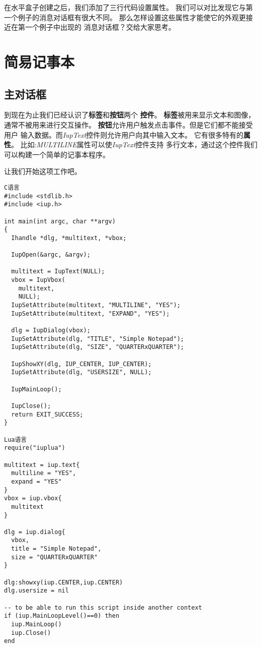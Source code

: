 \documentclass{ctexart}
\begin{document}
在水平盒子创建之后，我们添加了三行代码设置属性。
我们可以对比发现它与第一个例子的消息对话框有很大不同。
那么怎样设置这些属性才能使它的外观更接近在第一个例子中出现的
消息对话框？交给大家思考。

\section{简易记事本}

\subsection{主对话框}

到现在为止我们已经认识了\textbf{标签}和\textbf{按钮}两个
\textbf{控件}。
\textbf{标签}被用来显示文本和图像，通常不被用来进行交互操作。
\textbf{按钮}允许用户触发点击事件。但是它们都不能接受用户
输入数据。而\emph{IupText}控件则允许用户向其中输入文本。
它有很多特有的\textbf{属性}。
比如:\emph{MULTILINE}属性可以使\emph{IupText}控件支持
多行文本，通过这个控件我们可以构建一个简单的记事本程序。

让我们开始这项工作吧。

\lstset{language=C}
\begin{lstlisting}
C语言
#include <stdlib.h>
#include <iup.h>

int main(int argc, char **argv)
{
  Ihandle *dlg, *multitext, *vbox;

  IupOpen(&argc, &argv);

  multitext = IupText(NULL);
  vbox = IupVbox(
    multitext,
    NULL);
  IupSetAttribute(multitext, "MULTILINE", "YES");
  IupSetAttribute(multitext, "EXPAND", "YES");

  dlg = IupDialog(vbox);
  IupSetAttribute(dlg, "TITLE", "Simple Notepad");
  IupSetAttribute(dlg, "SIZE", "QUARTERxQUARTER");

  IupShowXY(dlg, IUP_CENTER, IUP_CENTER);
  IupSetAttribute(dlg, "USERSIZE", NULL);

  IupMainLoop();

  IupClose();
  return EXIT_SUCCESS;
}

Lua语言
require("iuplua")

multitext = iup.text{
  multiline = "YES",
  expand = "YES"
}
vbox = iup.vbox{
  multitext
}

dlg = iup.dialog{
  vbox,
  title = "Simple Notepad",
  size = "QUARTERxQUARTER"
}

dlg:showxy(iup.CENTER,iup.CENTER)
dlg.usersize = nil

-- to be able to run this script inside another context
if (iup.MainLoopLevel()==0) then
  iup.MainLoop()
  iup.Close()
end
\end{lstlisting}
\end{document}
